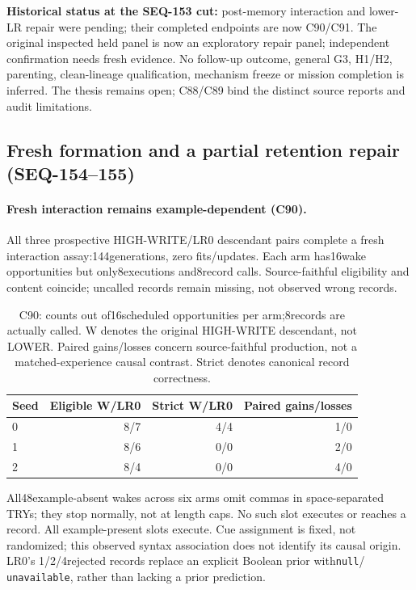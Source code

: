 \documentclass{article}
\begin{document}
\noindent\textbf{Historical status at the SEQ-153 cut:} post-memory interaction
and lower-LR repair were pending; their completed endpoints are now C90/C91. The original inspected held panel is now an
exploratory repair panel; independent confirmation needs fresh evidence. No
follow-up outcome, general G3, H1/H2, parenting, clean-lineage qualification,
mechanism freeze or mission completion is inferred. The thesis remains open;
C88/C89 bind the distinct source reports and audit limitations.

\subsection{Fresh formation and a partial retention repair (SEQ-154--155)}
\label{sec:seq155-extension}
\paragraph{Fresh interaction remains example-dependent (C90).}
All three prospective HIGH-WRITE/LR0 descendant pairs complete a fresh
interaction assay:144generations, zero fits/updates. Each arm has16wake
opportunities but only8executions and8record calls. Source-faithful eligibility
and content coincide; uncalled records remain missing, not observed wrong records.
\begin{table}[htbp]
\centering\small
\begin{tabular}{lrrr}
\toprule
Seed & Eligible W/LR0 & Strict W/LR0 & Paired gains/losses \\
\midrule
0 & 8/7 & 4/4 & 1/0 \\
1 & 8/6 & 0/0 & 2/0 \\
2 & 8/4 & 0/0 & 4/0 \\
\bottomrule
\end{tabular}
\caption{C90: counts out of16scheduled opportunities per arm;8records are
actually called. W denotes the original HIGH-WRITE descendant, not LOWER.
Paired gains/losses concern source-faithful production, not a matched-experience
causal contrast. Strict denotes canonical record correctness.}
\label{tab:seq154-formation}
\end{table}
All48example-absent wakes across six arms omit commas in space-separated TRYs;
they stop normally, not at length caps. No such slot executes or reaches a record.
All example-present slots execute. Cue assignment is fixed, not randomized;
this observed syntax association does not identify its causal origin. LR0's
1/2/4rejected records replace an explicit Boolean prior with\texttt{null}/
\texttt{unavailable}, rather than lacking a prior prediction. 
\end{document}
